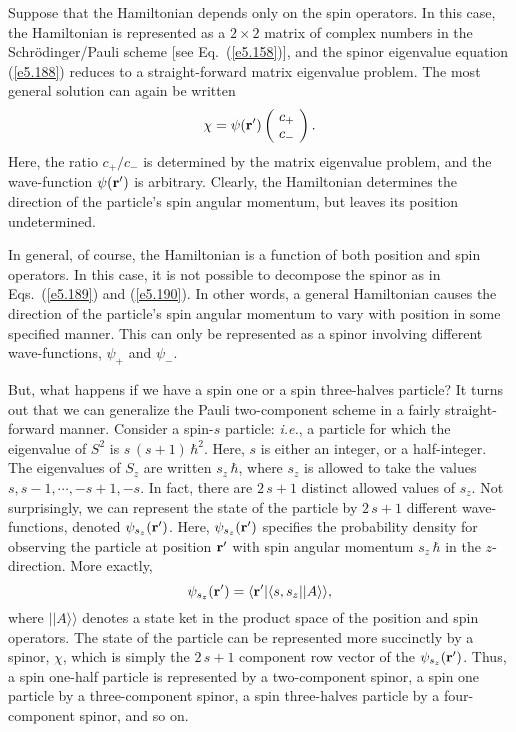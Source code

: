 Suppose that the Hamiltonian depends only on the spin operators. In this
case, the Hamiltonian is represented as a $2\times 2$ matrix of complex numbers 
in the Schr\"{o}dinger/Pauli scheme [see Eq.~(\ref{e5.158})], and the spinor eigenvalue
equation (\ref{e5.188})  reduces to a straight-forward matrix eigenvalue problem. 
The most general solution can again be written
\begin{equation}\label{e5.190}
\chi = \psi({\bf r}') \left(\!\begin{array}{c} c_+\\ c_-\end{array}\!\right).
\end{equation}
Here, the ratio $c_+/c_-$ is determined by the matrix eigenvalue problem,
and the wave-function $\psi({\bf r}')$ is arbitrary. Clearly, the Hamiltonian
determines the direction of the particle's spin angular momentum, but leaves
its position undetermined. 

In general, of course, the Hamiltonian is a function of both position and
spin operators. In this case, it is not possible to decompose the 
spinor as in Eqs.~(\ref{e5.189})  and (\ref{e5.190}).
 In other words, a general Hamiltonian causes the
direction of the particle's spin angular momentum to vary with position in
some specified manner. This can only be represented as a spinor involving 
different wave-functions, $\psi_+$ and $\psi_-$. 

But, what happens if we have a spin one  or a spin three-halves particle? 
It turns out that we can generalize the Pauli two-component scheme in a fairly
straight-forward manner. Consider a spin-$s$ particle: {\em i.e.}, a particle for which
the eigenvalue of $S^2$ is $s\,(s+1)\,\hbar^2$. Here, $s$ is either an integer, or a half-integer. The eigenvalues of $S_z$ are written $s_z\,\hbar$, where
$s_z$ is allowed to take the values $s, s-1, \cdots, -s+1, -s$. In fact,
there are $2\,s+1$ distinct allowed values of $s_z$. Not surprisingly, we can represent
the state of the particle by $2\,s+1$ different wave-functions, denoted $\psi_{s_z}
({\bf r}')$. Here, $\psi_{s_z}({\bf r}')$ specifies the probability density 
for observing the particle at position ${\bf r'}$ with spin angular
momentum $s_z\,\hbar$ in the $z$-direction. More exactly,
\begin{equation}
\psi_{s_z}({\bf r}') = \langle {\bf r'}|\langle s, s_z| |A\rangle\rangle,
\end{equation}
where $||A\rangle\rangle$ denotes a state ket in the product space of the position
and spin operators. The state of the particle can be represented more
succinctly by a spinor, $\chi$, which is simply the $2\,s+1$ component row
vector  of the $\psi_{s_z}({\bf r}')$.
Thus, a spin one-half particle is represented by a two-component spinor,
a spin one particle by a three-component spinor, a spin three-halves particle
by a four-component spinor, and so on. 

